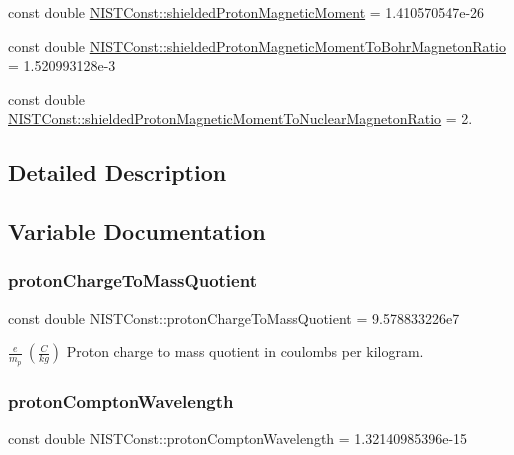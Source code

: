 \begin{DoxyCompactItemize}
\item 
const double \hyperlink{group___n_i_s_t_const-_proton_ga3e2c09881642d47d3e869c7803862e6f}{N\+I\+S\+T\+Const\+::shielded\+Proton\+Magnetic\+Moment} = 1.\+410570547e-\/26
\item 
const double \hyperlink{group___n_i_s_t_const-_proton_ga175eb518370bc31471e8ad763e760b72}{N\+I\+S\+T\+Const\+::shielded\+Proton\+Magnetic\+Moment\+To\+Bohr\+Magneton\+Ratio} = 1.\+520993128e-\/3
\item 
const double \hyperlink{group___n_i_s_t_const-_proton_ga03e84ef0d1452fa7c647f8866913fbc3}{N\+I\+S\+T\+Const\+::shielded\+Proton\+Magnetic\+Moment\+To\+Nuclear\+Magneton\+Ratio} = 2.
\end{DoxyCompactItemize}


\subsection{Detailed Description}


\subsection{Variable Documentation}
\mbox{\label{group___n_i_s_t_const-_proton_ga59d127bca4ef5416e0e42c4d05c35a68}} 
\subsubsection{\texorpdfstring{proton\+Charge\+To\+Mass\+Quotient}{protonChargeToMassQuotient}}
{\footnotesize\ttfamily const double N\+I\+S\+T\+Const\+::proton\+Charge\+To\+Mass\+Quotient = 9.\+578833226e7}

$\frac{e}{m_p} \ (\frac{C}{kg})$ Proton charge to mass quotient in coulombs per kilogram. \mbox{\label{group___n_i_s_t_const-_proton_ga79247734bd6f7409a382e17da7359680}} 
\subsubsection{\texorpdfstring{proton\+Compton\+Wavelength}{protonComptonWavelength}}
{\footnotesize\ttfamily const double N\+I\+S\+T\+Const\+::proton\+Compton\+Wavelength = 1.\+32140985396e-\/15}

